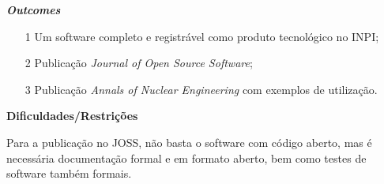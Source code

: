 \textbf{\textit{Outcomes}}

\begin{itemize}
	\item[1] Um software completo e registrável como produto tecnológico no 
INPI;
	\item[2] Publicação \textit{Journal of Open Source Software};
	\item[3] Publicação \textit{Annals of Nuclear Engineering} com exemplos de 
	utilização.
\end{itemize}

\textbf{Dificuldades/Restrições}

Para a publicação no JOSS, não basta o software com código aberto, mas é necessária 
documentação formal e em formato aberto, bem como testes de software também formais.\\

